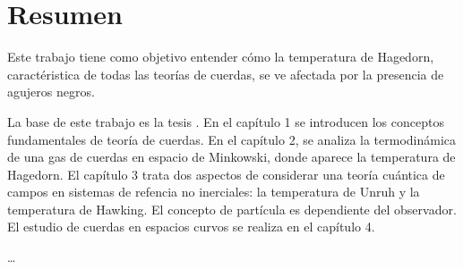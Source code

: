 \chapter*{Resumen}

Este trabajo tiene como objetivo entender cómo la temperatura de Hagedorn, 
caractéristica de todas las teorías de cuerdas, se ve afectada por la presencia de agujeros
negros.

La base de este trabajo es la tesis \cite{}.
En el capítulo 1 se introducen los conceptos fundamentales de teoría de cuerdas.
En el capítulo 2, se analiza la termodinámica de una gas de cuerdas en
espacio de Minkowski, donde aparece la temperatura de Hagedorn.
El capítulo 3 trata dos aspectos de considerar una teoría cuántica de campos en 
sistemas de refencia no inerciales: la temperatura de Unruh y la temperatura de Hawking.
El concepto de partícula es dependiente del observador.
El estudio de cuerdas en espacios curvos se realiza en el capítulo 4. 



\ldots


